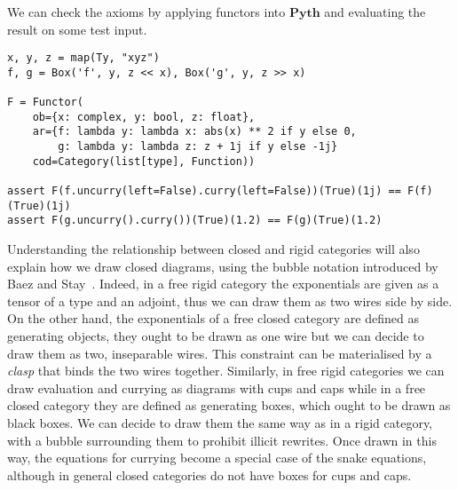 \begin{example}
We can check the axioms by applying functors into $\mathbf{Pyth}$ and evaluating the result on some test input.

\begin{verbatim}
x, y, z = map(Ty, "xyz")
f, g = Box('f', y, z << x), Box('g', y, z >> x)

F = Functor(
    ob={x: complex, y: bool, z: float},
    ar={f: lambda y: lambda x: abs(x) ** 2 if y else 0,
        g: lambda y: lambda z: z + 1j if y else -1j}
    cod=Category(list[type], Function))

assert F(f.uncurry(left=False).curry(left=False))(True)(1j) == F(f)(True)(1j)
assert F(g.uncurry().curry())(True)(1.2) == F(g)(True)(1.2)
\end{verbatim}
\end{example}

Understanding the relationship between closed and rigid categories will also explain how we draw closed diagrams, using the bubble notation introduced by Baez and Stay~\cite[Section~2.6]{BaezStay09}.
Indeed, in a free rigid category the exponentials are given as a tensor of a type and an adjoint, thus we can draw them as two wires side by side.
On the other hand, the exponentials of a free closed category are defined as generating objects, they ought to be drawn as one wire but we can decide to draw them as two, inseparable wires.
This constraint can be materialised by a \emph{clasp} that binds the two wires together.
Similarly, in free rigid categories we can draw evaluation and currying as diagrams with cups and caps while in a free closed category they are defined as generating boxes, which ought to be drawn as black boxes.
We can decide to draw them the same way as in a rigid category, with a bubble surrounding them to prohibit illicit rewrites.
Once drawn in this way, the equations for currying become a special case of the snake equations, although in general closed categories do not have boxes for cups and caps.


